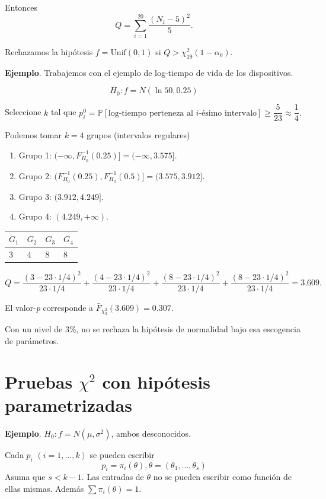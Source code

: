 \documentclass[
  12pt,
]{book}
\begin{document}
Entonces
\[Q = \sum_{i=1}^{20}\dfrac{(N_i-5)^2}{5}.\]

Rechazamos la hipótesis \(f = \text{Unif}(0,1)\) si \(Q>\chi^2_{19}(1-\alpha_0)\).

\textbf{Ejemplo}. Trabajemos con el ejemplo de log-tiempo de vida de los dispositivos.

\[H_0: f = N(\ln50,0.25)\]

Seleccione \(k\) tal que \(p_i^0 = \mathbb P[\text{log-tiempo perteneza al }i\text{-ésimo intervalo}]\geq \dfrac 5{23}\approx \dfrac 14.\)

Podemos tomar \(k = 4\) grupos (intervalos regulares)

\begin{enumerate}
\def\labelenumi{\arabic{enumi}.}
\item
  Grupo 1: \((-\infty,F^{-1}_{H_0}(0.25)] = (-\infty,3.575]\).
\item
  Grupo 2: \((F^{-1}_{H_0}(0.25),F^{-1}_{H_0}(0.5)] = (3.575,3.912]\).
\item
  Grupo 3: \((3.912,4.249]\).
\item
  Grupo 4: \((4.249,+\infty)\).
\end{enumerate}

\begin{longtable}[]{@{}llll@{}}
\toprule
\(G_1\) & \(G_2\) & \(G_3\) & \(G_4\)\tabularnewline
\midrule
\endhead
\(3\) & \(4\) & \(8\) & \(8\)\tabularnewline
\bottomrule
\end{longtable}

\[Q = \dfrac{(3-23\cdot1/4)^2}{23\cdot 1/4} +  \dfrac{(4-23\cdot1/4)^2}{23\cdot 1/4}+\dfrac{(8-23\cdot1/4)^2}{23\cdot 1/4} + \dfrac{(8-23\cdot1/4)^2}{23\cdot 1/4}= 3.609.\]

El valor-\emph{p} corresponde a \(\bar F_{\chi^2_3}(3.609) = 0.307\).

Con un nivel de 3\%, no se rechaza la hipótesis de normalidad bajo esa escogencia de parámetros.

\hypertarget{pruebas-chi2-con-hipuxf3tesis-parametrizadas}{%
\section{\texorpdfstring{Pruebas \(\chi^2\) con hipótesis parametrizadas}{Pruebas \textbackslash chi\^{}2 con hipótesis parametrizadas}}\label{pruebas-chi2-con-hipuxf3tesis-parametrizadas}}

\textbf{Ejemplo}. \(H_0: f = N(\mu,\sigma^2)\), ambos desconocidos.

Cada \(p_i\) \((i=1,\dots,k)\) se pueden escribir
\[p_i = \pi_i(\theta), \theta = (\theta_1,\dots,\theta_s)\]
Asuma que \(s<k-1\). Las entradas de \(\theta\) no se pueden escribir como función de ellas mismas. Además \(\sum \pi_i(\theta) = 1\).
\end{document}
